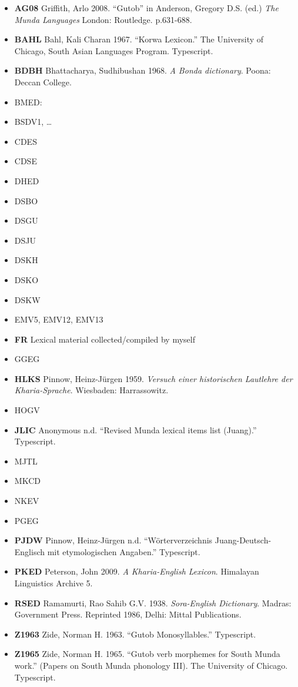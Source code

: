 \documentclass[a4paper,]{article}
\providecommand{\tightlist}{%
  \setlength{\itemsep}{0pt}\setlength{\parskip}{0pt}}
\begin{document}
\begin{itemize}
\tightlist
\item
  \textbf{AG08} Griffith, Arlo 2008. ``Gutob'' in Anderson, Gregory D.S.
  (ed.) \emph{The Munda Languages} London: Routledge. p.631-688.
\item
  \textbf{BAHL} Bahl, Kali Charan 1967. ``Korwa Lexicon.'' The
  University of Chicago, South Asian Languages Program. Typescript.
\item
  \textbf{BDBH} Bhattacharya, Sudhibushan 1968. \emph{A Bonda
  dictionary}. Poona: Deccan College.
\item
  BMED:
\item
  BSDV1, \ldots{}
\item
  CDES
\item
  CDSE
\item
  DHED
\item
  DSBO
\item
  DSGU
\item
  DSJU
\item
  DSKH
\item
  DSKO
\item
  DSKW
\item
  EMV5, EMV12, EMV13
\item
  \textbf{FR} Lexical material collected/compiled by myself
\item
  GGEG
\item
  \textbf{HLKS} Pinnow, Heinz-Jürgen 1959. \emph{Versuch einer
  historischen Lautlehre der Kharia-Sprache}. Wiesbaden: Harrassowitz.
\item
  HOGV
\item
  \textbf{JLIC} Anonymous n.d. ``Revised Munda lexical items list
  (Juang).'' Typescript.
\item
  MJTL
\item
  MKCD
\item
  NKEV
\item
  PGEG
\item
  \textbf{PJDW} Pinnow, Heinz-Jürgen n.d. ``Wörterverzeichnis
  Juang-Deutsch-Englisch mit etymologischen Angaben.'' Typescript.
\item
  \textbf{PKED} Peterson, John 2009. \emph{A Kharia-English Lexicon}.
  Himalayan Linguistics Archive 5.
\item
  \textbf{RSED} Ramamurti, Rao Sahib G.V. 1938. \emph{Sora-English
  Dictionary}. Madras: Government Press. Reprinted 1986, Delhi: Mittal
  Publications.
\item
  \textbf{Z1963} Zide, Norman H. 1963. ``Gutob Monosyllables.''
  Typescript.
\item
  \textbf{Z1965} Zide, Norman H. 1965. ``Gutob verb morphemes for South
  Munda work.'' (Papers on South Munda phonology III). The University of
  Chicago. Typescript.
\end{itemize}
\end{document}
